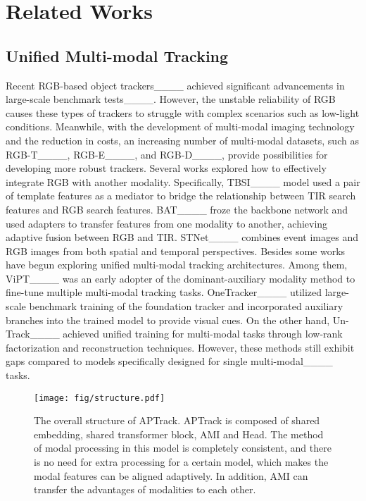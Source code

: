 \section{Related Works}
\subsection{Unified Multi-modal Tracking}
Recent RGB-based object trackers____ achieved significant advancements in large-scale benchmark tests____. However, the unstable reliability of RGB causes these types of trackers to struggle with complex scenarios such as low-light conditions. Meanwhile, with the development of multi-modal imaging technology and the reduction in costs, an increasing number of multi-modal datasets, such as RGB-T____, RGB-E____, and RGB-D____, provide possibilities for developing more robust trackers. 
Several works explored how to effectively integrate RGB with another modality. Specifically, TBSI____ model used a pair of template features as a mediator to bridge the relationship between TIR search features and RGB search features. BAT____ froze the backbone network and used adapters to transfer features from one modality to another, achieving adaptive fusion between RGB and TIR. STNet____ combines event images and RGB images from both spatial and temporal perspectives. 
Besides some works have begun exploring unified multi-modal tracking architectures. Among them, ViPT____ was an early adopter of the dominant-auxiliary modality method to fine-tune multiple multi-modal tracking tasks. OneTracker____ utilized large-scale benchmark training of the foundation tracker and incorporated auxiliary branches into the trained model to provide visual cues. On the other hand, Un-Track____ achieved unified training for multi-modal tasks through low-rank factorization and reconstruction techniques. 
However, these methods still exhibit gaps compared to models specifically designed for single multi-modal____ tasks.

\begin{figure*}
    \centering
    \texttt{[image: fig/structure.pdf]}
    \caption{The overall structure of APTrack. APTrack is composed of shared embedding, shared transformer block, AMI and Head. The method of modal processing in this model is completely consistent, and there is no need for extra processing for a certain model, which makes the modal features can be aligned adaptively. In addition, AMI can transfer the advantages of modalities to each other.
 }
  \label{fig:struct} 
\end{figure*}


